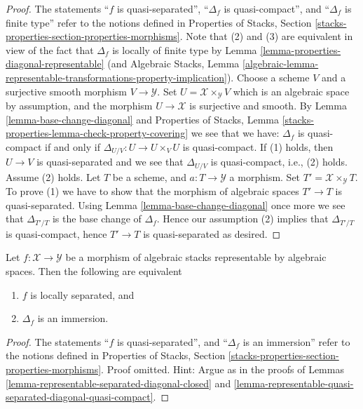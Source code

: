 \begin{proof}
The statements
``$f$ is quasi-separated'',
``$\Delta_f$ is quasi-compact'', and
``$\Delta_f$ is finite type''
refer to the notions defined in
Properties of Stacks,
Section \ref{stacks-properties-section-properties-morphisms}.
Note that (2) and (3) are equivalent in view of the fact that
$\Delta_f$ is locally of finite type by
Lemma \ref{lemma-properties-diagonal-representable}
(and
Algebraic Stacks, Lemma
\ref{algebraic-lemma-representable-transformations-property-implication}).
Choose a scheme $V$ and a surjective smooth morphism $V \to \mathcal{Y}$.
Set $U = \mathcal{X} \times_{\mathcal{Y}} V$ which is an algebraic
space by assumption, and the morphism $U \to \mathcal{X}$ is surjective
and smooth. By
Lemma \ref{lemma-base-change-diagonal}
and
Properties of Stacks,
Lemma \ref{stacks-properties-lemma-check-property-covering}
we see that we have: $\Delta_f$ is quasi-compact if and only if
$\Delta_{U/V} : U \to  U \times_V U$ is quasi-compact.
If (1) holds, then $U \to V$ is quasi-separated and we see that
$\Delta_{U/V}$ is quasi-compact, i.e., (2) holds.
Assume (2) holds. Let $T$ be a scheme, and $a : T \to \mathcal{Y}$
a morphism. Set $T' = \mathcal{X} \times_{\mathcal{Y}} T$. To prove
(1) we have to show that the morphism of algebraic spaces $T' \to T$
is quasi-separated. Using
Lemma \ref{lemma-base-change-diagonal}
once more we see that $\Delta_{T'/T}$ is the base change of
$\Delta_f$. Hence our assumption (2) implies that $\Delta_{T'/T}$
is quasi-compact, hence $T' \to T$ is quasi-separated as desired.
\end{proof}

\begin{lemma}
\label{lemma-representable-locally-separated-diagonal-immersion}
Let $f : \mathcal{X} \to \mathcal{Y}$ be a morphism of algebraic stacks
representable by algebraic spaces. Then the following are equivalent
\begin{enumerate}
\item $f$ is locally separated, and
\item $\Delta_f$ is an immersion.
\end{enumerate}
\end{lemma}

\begin{proof}
The statements ``$f$ is quasi-separated'', and ``$\Delta_f$ is an immersion''
refer to the notions defined in
Properties of Stacks,
Section \ref{stacks-properties-section-properties-morphisms}.
Proof omitted. Hint: Argue as in the proofs of
Lemmas \ref{lemma-representable-separated-diagonal-closed} and
\ref{lemma-representable-quasi-separated-diagonal-quasi-compact}.
\end{proof}






